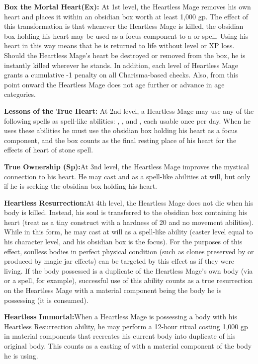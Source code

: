 \textbf{Box the Mortal Heart(Ex):} At 1st level, the Heartless Mage removes his own heart and places it within an obsidian box worth at least 1,000 gp. The effect of this transformation is that whenever the Heartless Mage is killed, the obsidian box holding his heart may be used as a focus component to a  or  spell. Using his heart in this way means that he is returned to life without level or XP loss. Should the Heartless Mage's heart be destroyed or removed from the box, he is instantly killed wherever he stands. In addition, each level of Heartless Mage grants a cumulative -1 penalty on all Charisma-based checks. Also, from this point onward the Heartless Mage does not age further or advance in age categories.

\textbf{Lessons of the True Heart:} At 2nd level, a Heartless Mage may use any of the following spells as spell-like abilities: , , and , each usable once per day. When he uses these abilities he must use the obsidian box holding his heart as a focus component, and the box counts as the final resting place of his heart for the effects of heart of stone spell.

\textbf{True Ownership (Sp):}At 3nd level, the Heartless Mage improves the mystical connection to his heart. He may cast  and  as a spell-like abilities at will, but only if he is seeking the obsidian box holding his heart.

\textbf{Heartless Resurrection:}At 4th level, the Heartless Mage does not die when his body is killed. Instead, his soul is transferred to the obsidian box containing his heart (treat as a tiny construct with a hardness of 20 and no movement abilities). While in this form, he may cast  at will as a spell-like ability (caster level equal to his character level, and his obsidian box is the focus). For the purposes of this effect, soulless bodies in perfect physical condition (such as clones preserved by  or  produced by magic jar effects) can be targeted by this effect as if they were living. If the body possessed is a duplicate of the Heartless Mage's own body (via  or a  spell, for example), successful use of this ability counts as a true resurrection on the Heartless Mage with a material component being the body he is possessing (it is consumed).

\textbf{Heartless Immortal:}When a Heartless Mage is possessing a body with his Heartless Resurrection ability, he may perform a 12-hour ritual costing 1,000 gp in material components that recreates his current body into duplicate of his original body. This counts as a casting of  with a material component of the body he is using.